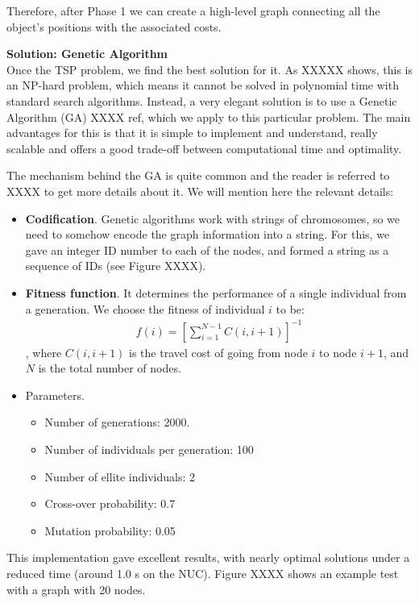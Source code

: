 Therefore, after Phase 1 we can create a high-level graph connecting all the object's positions with the associated costs. 

\textbf{Solution: Genetic Algorithm}\\
Once the TSP problem, we find the best solution for it. As XXXXX shows, this is an NP-hard problem, which means it cannot be solved in polynomial time with standard search algorithms. Instead, a very elegant solution is to use a Genetic Algorithm (GA) XXXX ref, which we apply to this particular problem. The main advantages for this is that it is simple to implement and understand, really scalable and offers a good trade-off between computational time and optimality. 

The mechanism behind the GA is quite common and the reader is referred to XXXX to get more details about it. We will mention here the relevant details:
\begin{itemize}
\item \textbf{Codification}. Genetic algorithms work with strings of chromosomes, so we need to somehow encode the graph information into a string. For this, we gave an integer ID number to each of the nodes, and formed a string as a sequence of IDs (see Figure XXXX).
\item \textbf{Fitness function}. It determines the performance of a single individual from a generation. We choose the fitness of individual $i$ to be:
\begin{align}
f(i) = \left[\sum_{i = 1}^{N-1} C(i,i+1)\right]^{-1}
\end{align}
, where $C(i, i+1)$ is the travel cost of going from node $i$ to node $i+1$, and $N$ is the total number of nodes.
\item Parameters. 
\begin{itemize}
\item Number of generations: 2000.
\item Number of individuals per generation: 100
\item Number of ellite individuals: 2
\item Cross-over probability: 0.7
\item Mutation probability: 0.05
\end{itemize}
\end{itemize}

This implementation gave excellent results, with nearly optimal solutions under a reduced time (around 1.0 s on the NUC). Figure XXXX shows an example test with a graph with 20 nodes. 

